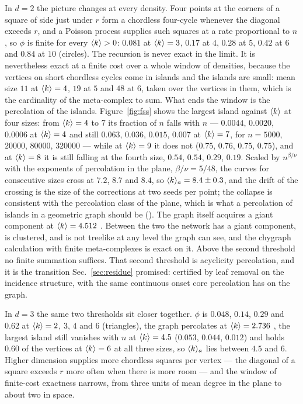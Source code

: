 In $d=2$ the picture changes at every density. Four points at the corners of
a square of side just under $r$ form a chordless four-cycle whenever the
diagonal exceeds $r$, and a Poisson process supplies such squares at a rate
proportional to $n$, so $\phi$ is finite for every $\langle k \rangle>0$:
$0.081$ at $\langle k \rangle=3$, $0.17$ at $4$, $0.28$ at $5$, $0.42$ at $6$ and
$0.84$ at $10$ (circles). The recursion is never exact in the limit. It is
nevertheless exact at a finite cost over a whole window of densities,
because the vertices on short chordless cycles come in islands and the
islands are small: mean size $11$ at $\langle k \rangle=4$, $19$ at $5$ and $48$ at $6$, taken over
the vertices in them, which is the cardinality of the meta-complex to sum. What
ends the window is the percolation of the islands. Figure~\ref{fig:fss} shows
the largest island against $\langle k \rangle$ at four sizes: from $\langle k \rangle=4$ to $7$
its fraction of $n$ falls with $n$ --- $0.0044$, $0.0020$, $0.0006$ at
$\langle k \rangle=4$ and still $0.063$, $0.036$, $0.015$, $0.007$ at $\langle k \rangle=7$,
for $n=5000$, $20000$, $80000$, $320000$ --- while at $\langle k \rangle=9$ it does
not ($0.75$, $0.76$, $0.75$, $0.75$), and at $\langle k \rangle=8$ it is still
falling at the fourth size, $0.54$, $0.54$, $0.29$, $0.19$. Scaled by
$n^{\beta/\nu}$ with the exponents of percolation in the plane,
$\beta/\nu=5/48$, the curves for consecutive sizes cross at $7.2$, $8.7$
and $8.4$, so $\langle k \rangle_{a}=8.4\pm0.3$, and the drift of the crossing is
the size of the corrections at two seeds per point; the collapse is
consistent with the percolation class of the plane, which is what a
percolation of islands in a geometric graph should be
(). The graph itself
acquires a giant component at $\langle k \rangle=4.512$ \citep{penrose2003}. Between
the two the network has a giant component, is clustered, and is not treelike
at any level the graph can see, and the chygraph calculation with finite
meta-complexes is exact on it. Above the second threshold no finite summation
suffices. That second threshold is acyclicity percolation, and it is the
transition Sec.~\ref{sec:residue} promised: certified by leaf removal on the
incidence structure, with the same continuous onset core percolation has on
the graph.

In $d=3$ the same two thresholds sit closer together. $\phi$ is $0.048$,
$0.14$, $0.29$ and $0.62$ at $\langle k \rangle=2$, $3$, $4$ and $6$ (triangles), the
graph percolates at $\langle k \rangle=2.736$ \citep{penrose2003}, the largest island
still vanishes with $n$ at $\langle k \rangle=4.5$ ($0.053$, $0.044$, $0.012$) and
holds $0.60$ of the vertices at $\langle k \rangle=6$ at all three sizes, so
$\langle k \rangle_{a}$ lies between $4.5$ and $6$. Higher dimension supplies more
chordless squares per vertex --- the diagonal of a square exceeds $r$ more
often when there is more room --- and the window of finite-cost exactness
narrows, from three units of mean degree in the plane to about two in
space.

